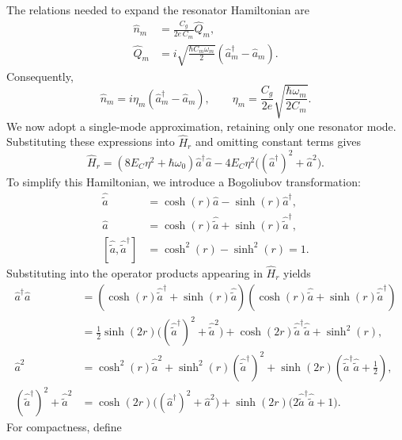 \documentclass[11pt,a4paper]{article}
\numberwithin{equation}{section}
\begin{document}
The relations needed to expand the resonator Hamiltonian are
\begin{equation}
  \begin{aligned}
    \hat n_m &=\frac{C_g}{2e\,C_m}\hat Q_m,\\
    \hat Q_m &=i\sqrt{\frac{\hbar C_m\omega_m}{2}}
      (\hat a_m^\dagger-\hat a_m).
  \end{aligned}
\end{equation}
Consequently,
\begin{equation}
  \hat n_m=i\eta_m(\hat a_m^\dagger-\hat a_m),
  \qquad
  \eta_m=\frac{C_g}{2e}\sqrt{\frac{\hbar\omega_m}{2C_m}}.
\end{equation}
We now adopt a single-mode approximation, retaining only one resonator
mode. Substituting these expressions into $\hat H_r$ and omitting
constant terms gives
\begin{equation}
  \hat H_r =(8E_C\eta^2+\hbar\omega_0)\hat a^\dagger\hat a -4E_C\eta^2\bigl((\hat a^\dagger)^2+\hat a^2\bigr).
\end{equation}
To simplify this Hamiltonian, we introduce a Bogoliubov transformation:
\begin{align}
  \hat{\tilde a}
    &=\cosh(r)\hat a-\sinh(r)\hat a^\dagger, \\
  \hat a
    &=\cosh(r)\hat{\tilde a}+\sinh(r)\hat{\tilde a}^\dagger, \\
  [\hat{\tilde a},\hat{\tilde a}^\dagger]
    &=\cosh^2(r)-\sinh^2(r)=1.
\end{align}
Substituting into the operator products appearing in $\hat H_r$ yields
\begin{equation}
  \begin{aligned}
    \hat a^\dagger\hat a
      &=(\cosh(r)\hat{\tilde a}^\dagger+\sinh(r)\hat{\tilde a}) (\cosh(r)\hat{\tilde a}+\sinh(r)\hat{\tilde a}^\dagger) \\
      &=\frac12\sinh(2r) \bigl((\hat{\tilde a}^\dagger)^2+\hat{\tilde a}^2\bigr)+\cosh(2r)\hat{\tilde a}^\dagger\hat{\tilde a}
          +\sinh^2(r), \\
    \hat a^2
      &=\cosh^2(r)\hat{\tilde a}^2+\sinh^2(r)(\hat{\tilde a}^\dagger)^2+\sinh(2r)\left(\hat{\tilde a}^\dagger\hat{\tilde a}+\frac12\right), \\
    (\hat{\tilde a}^\dagger)^2+\hat{\tilde a}^2
      &=\cosh(2r)\bigl((\hat a^\dagger)^2+\hat a^2\bigr)+\sinh(2r) \bigl(2\hat{\tilde a}^\dagger\hat{\tilde a}+1\bigr).
  \end{aligned}
\end{equation}
For compactness, define
\end{document}
